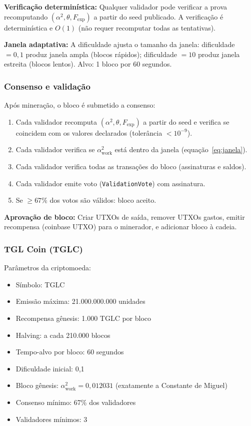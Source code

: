 \documentclass[12pt,a4paper]{article}
\newcommand{\alphaii}{\alpha^2}
\newcommand{\Fexp}{F_{\text{exp}}}
\begin{document}
\textbf{Verificação determinística:} Qualquer validador pode
verificar a prova recomputando
$(\alphaii, \theta, \Fexp)$ a partir do seed publicado. A
verificação é determinística e $O(1)$ (não requer recomputar
todas as tentativas).

\textbf{Janela adaptativa:} A dificuldade ajusta o tamanho da
janela: dificuldade $= 0{,}1$ produz janela ampla (blocos
rápidos); dificuldade $= 10$ produz janela estreita (blocos
lentos). Alvo: 1 bloco por 60 segundos.

\subsubsection{Consenso e validação}

Após mineração, o bloco é submetido a consenso:

\begin{enumerate}[nosep]
\item Cada validador recomputa $(\alphaii, \theta, \Fexp)$ a
  partir do seed e verifica se coincidem com os valores
  declarados (tolerância $< 10^{-9}$).
\item Cada validador verifica se $\alphaii_{\text{work}}$ está
  dentro da janela (equação~\ref{eq:janela}).
\item Cada validador verifica todas as transações do bloco
  (assinaturas e saldos).
\item Cada validador emite voto (\texttt{ValidationVote}) com
  assinatura.
\item Se $\geq 67\%$ dos votos são válidos: bloco aceito.
\end{enumerate}

\textbf{Aprovação de bloco:} Criar UTXOs de saída, remover
UTXOs gastos, emitir recompensa (coinbase UTXO) para o
minerador, e adicionar bloco à cadeia.

\subsubsection{TGL Coin (TGLC)}

Parâmetros da criptomoeda:
\begin{itemize}[nosep]
\item Símbolo: TGLC
\item Emissão máxima: 21.000.000.000 unidades
\item Recompensa gênesis: 1.000 TGLC por bloco
\item Halving: a cada 210.000 blocos
\item Tempo-alvo por bloco: 60 segundos
\item Dificuldade inicial: 0,1
\item Bloco gênesis: $\alphaii_{\text{work}} = 0{,}012031$
  (exatamente a Constante de Miguel)
\item Consenso mínimo: 67\% dos validadores
\item Validadores mínimos: 3
\end{itemize}
\end{document}
